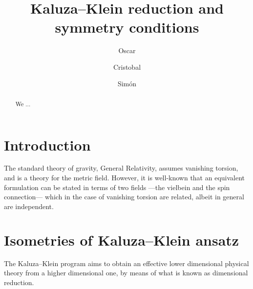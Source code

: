 \documentclass[aps,prd,12pt,superscriptaddress,showpacs,showkeys,reprint]{revtex4-1}
\begin{document}
\title{Kaluza--Klein reduction and symmetry conditions}

\author{Oscar }

\author{Cristobal }

\author{Sim\'on }

\begin{abstract}
  We ...
\end{abstract}



\maketitle

\section{\label{intro}Introduction}

The standard theory of gravity, General Relativity, assumes vanishing torsion, and is a theory for the metric field. However, it is well-known that an equivalent formulation can be stated in terms of two fields ---the vielbein and the spin connection--- which in the case of vanishing torsion are related, albeit in general are independent.

\section{Isometries of Kaluza--Klein ansatz}

The Kaluza--Klein program aims to obtain an effective lower dimensional physical theory from a higher dimensional one, by means of what is known as dimensional reduction.
\end{document}
